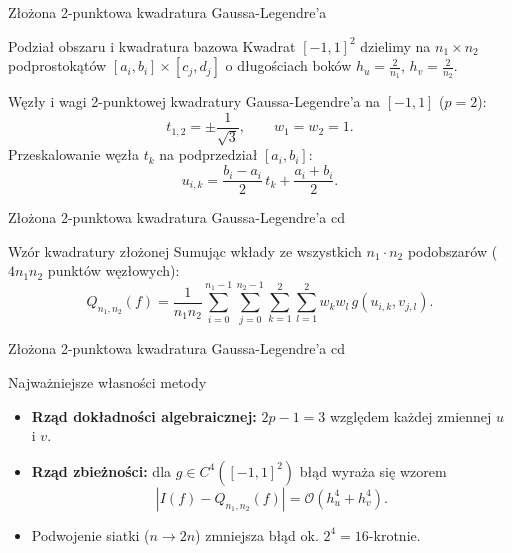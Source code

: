 \documentclass[aspectratio=169, 10pt, xcolor={table}]{beamer}
\begin{document}
\begin{frame}{Złożona 2-punktowa kwadratura Gaussa-Legendre'a}
      \begin{block}{Podział obszaru i kwadratura bazowa}
        Kwadrat $[-1, 1]^2$ dzielimy na $n_1 \times n_2$ podprostokątów $[a_i, b_i] \times [c_j, d_j]$ o długościach boków $h_u = \frac{2}{n_1}$, $h_v = \frac{2}{n_2}$.

        \vspace{0.15cm}
        Węzły i wagi 2-punktowej kwadratury Gaussa-Legendre'a na $[-1, 1]$ ($p = 2$):
        \[
          t_{1,2} = \pm\frac{1}{\sqrt{3}}, \qquad w_1 = w_2 = 1.
        \]
        Przeskalowanie węzła $t_k$ na podprzedział $[a_i, b_i]$:
        \[
          u_{i,k} = \frac{b_i - a_i}{2}\,t_k + \frac{a_i + b_i}{2}.
        \]
      \end{block}
\end{frame}
\begin{frame}{Złożona 2-punktowa kwadratura Gaussa-Legendre'a cd}
      \begin{block}{Wzór kwadratury złożonej}
        Sumując wkłady ze wszystkich $n_1 \cdot n_2$ podobszarów ($4 n_1 n_2$ punktów węzłowych):
        \[
          Q_{n_1,n_2}(f) = \frac{1}{n_1 n_2} \sum_{i=0}^{n_1-1}\sum_{j=0}^{n_2-1}\sum_{k=1}^{2}\sum_{l=1}^{2} w_k w_l\, g(u_{i,k}, v_{j,l}).
        \]
      \end{block}
\end{frame}
\begin{frame}{Złożona 2-punktowa kwadratura Gaussa-Legendre'a cd}
      \begin{exampleblock}{Najważniejsze własności metody}
        \begin{itemize}
          \item \textbf{Rząd dokładności algebraicznej:} $2p - 1 = 3$ względem każdej zmiennej $u$ i $v$.
          \item \textbf{Rząd zbieżności:} dla $g \in C^4([-1,1]^2)$ błąd wyraża się wzorem
          \[
            |I(f) - Q_{n_1,n_2}(f)| = \mathcal{O}\!\left(h_u^4 + h_v^4\right).
          \]
          \item Podwojenie siatki ($n \to 2n$) zmniejsza błąd ok. $2^4 = 16$-krotnie.
        \end{itemize}
      \end{exampleblock}

\end{frame}
\end{document}
